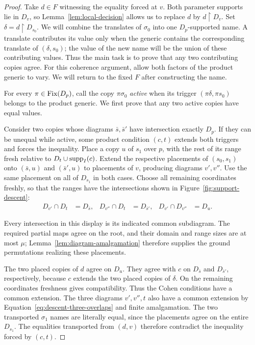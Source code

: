 \begin{proof}
Take \(d\in F\) witnessing the equality forced at \(v\).
Both parameter supports lie in \(D_v\), so
Lemma~\ref{lem:local-decision} allows us to replace \(d\) by
\(d\restriction D_v\).  Set
\(\delta=d\restriction D_{s_0}\).
We will combine the translates of \(\sigma_0\) into one
\(D_p\)-supported name.  A translate contributes its value only when
the generic contains the corresponding translate of
\((\delta,s_0)\); the value of the new name will be the union of these
contributing values.  Thus the main task is to prove that any two
contributing copies agree.  For this coherence argument, allow both
factors of the product generic to vary.  We will return to the fixed
\(F\) after constructing the name.

For every \(\pi\in\operatorname{Fix}(D_p)\), call the copy
\(\pi\sigma_0\) \emph{active} when its trigger
\((\pi\delta,\pi s_0)\) belongs to the product generic.
We first prove that any two active copies have equal values.

Consider two copies whose diagrams \(\bar s,\bar s'\) have
intersection exactly \(D_p\).  If they can be unequal while active,
some product condition \((c,t)\) extends both triggers and forces
the inequality.
Place a copy \(u\) of \(s_1\) over \(p\), with the rest of its
range fresh relative to \(D_t\cup\operatorname{supp}_I(c)\).
Extend the respective placements of
\((s_0,s_1)\) onto \((\bar s,u)\) and \((\bar s',u)\) to
placements of \(v\), producing diagrams \(v',v''\).
Use the same placement on all of \(D_{s_1}\) in both cases.
Choose all remaining coordinates freshly, so that the ranges have the
intersections shown in Figure~\ref{fig:support-descent}:
\begin{equation}\label{eq:descent-three-overlaps}
 \begin{aligned}
 D_{v'}\cap D_t&=D_{\bar s},&
 D_{v''}\cap D_t&=D_{\bar s'},&
 D_{v'}\cap D_{v''}&=D_u .
 \end{aligned}
\end{equation}

Every intersection in this display is its indicated common
subdiagram.  The required partial maps agree on the root, and
their domain and range sizes are at most \(\mu\);
Lemma~\ref{lem:diagram-amalgamation} therefore supplies the
ground permutations realizing these placements.

The two placed copies of \(d\) agree on \(D_u\).
They agree with \(c\) on \(D_{\bar s}\) and \(D_{\bar s'}\),
respectively, because \(c\) extends the two placed copies of
\(\delta\).  On the remaining coordinates freshness gives
compatibility.  Thus the Cohen conditions have a common extension.
The three diagrams \(v',v'',t\) also have a common extension by
Equation~\eqref{eq:descent-three-overlaps} and finite amalgamation.
The two transported \(\sigma_1\) names are literally equal,
since the placements agree on the entire \(D_{s_1}\).
The equalities transported from \((d,v)\) therefore contradict
the inequality forced by \((c,t)\).


\end{proof}
